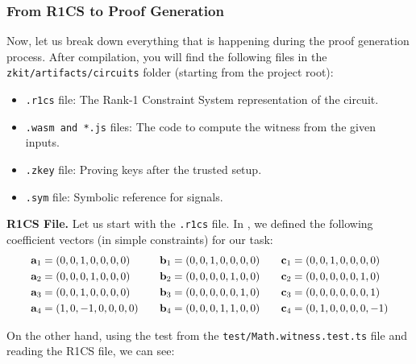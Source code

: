 \documentclass[../lecture-notes.tex]{subfiles}
\begin{document}
    \subsubsection{From R1CS to Proof Generation}

    Now, let us break down everything that is happening during the proof
    generation process. After compilation, you will find the following files in
    the \\
    \texttt{zkit/artifacts/circuits} folder (starting from the project root):
    \begin{itemize}
        \item \texttt{.r1cs} file: The Rank-1 Constraint System representation of the circuit.
        \item \texttt{.wasm and *.js} files: The code to compute the witness from the given inputs.
        \item \texttt{.zkey} file: Proving keys after the trusted setup.
        \item \texttt{.sym} file: Symbolic reference for signals.
    \end{itemize}

    \textbf{R1CS File.} Let us start with the \texttt{.r1cs} file. In ,
    we defined the following coefficient vectors (in simple constraints) for our
    task:
    \begin{equation*}
        \scalebox{0.95}{$
        \begin{aligned}
            \mathbf{a}_1 &= (0, 0, 1, 0, 0, 0, 0) & \quad \mathbf{b}_1 &= (0, 0, 1, 0, 0, 0, 0) & \quad \mathbf{c}_1 &= (0, 0, 1, 0, 0, 0, 0) \\
            \mathbf{a}_2 &= (0, 0, 0, 1, 0, 0, 0) & \quad \mathbf{b}_2 &= (0, 0, 0, 0, 1, 0, 0) & \quad \mathbf{c}_2 &= (0, 0, 0, 0, 0, 1, 0) \\
            \mathbf{a}_3 &= (0, 0, 1, 0, 0, 0, 0) & \quad \mathbf{b}_3 &= (0, 0, 0, 0, 0, 1, 0) & \quad \mathbf{c}_3 &= (0, 0, 0, 0, 0, 0, 1) \\
            \mathbf{a}_4 &= (1, 0, -1, 0, 0, 0, 0) & \quad \mathbf{b}_4 &= (0, 0, 0, 1, 1, 0, 0) & \quad \mathbf{c}_4 &= (0, 1, 0, 0, 0, 0, -1)
        \end{aligned}
        $}
    \end{equation*}

    On the other hand, using the test from the \texttt{test/Math.witness.test.ts} file and reading the R1CS file, we can see:
\end{document}
